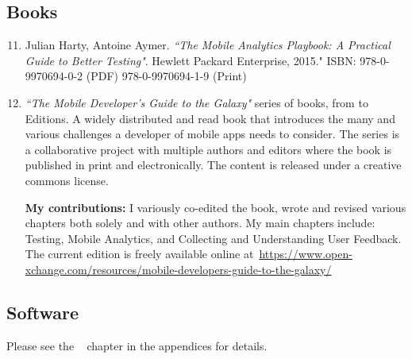 \subsection{Books}
\begin{enumerate}
    \setcounter{enumi}{10}
    \item Julian Harty, Antoine Aymer. \emph{``The Mobile Analytics Playbook: A Practical Guide to Better Testing"}. Hewlett Packard Enterprise, 2015."
    ISBN: 978-0-9970694-0-2 (PDF) 978-0-9970694-1-9 (Print)

    \item \emph{``The Mobile Developer's Guide to the Galaxy"} series of books, from  to  Editions. A widely distributed and read book that introduces the many and various challenges a developer of mobile apps needs to consider. The series is a collaborative project with multiple authors and editors where the book is published in print and electronically. The content is released under a creative commons license. 
    
    \textbf{My contributions:} I variously co-edited the book, wrote and revised various chapters both solely and with other authors. My main chapters include: Testing, Mobile Analytics, and Collecting and Understanding User Feedback. The current edition is freely available online at~\url{https://www.open-xchange.com/resources/mobile-developers-guide-to-the-galaxy/}
\end{enumerate}

\subsection{Software}
Please see the ~\hyperlink{software-contributions-chapter}{\emph{}} chapter in the appendices for details. 
\clearpage
